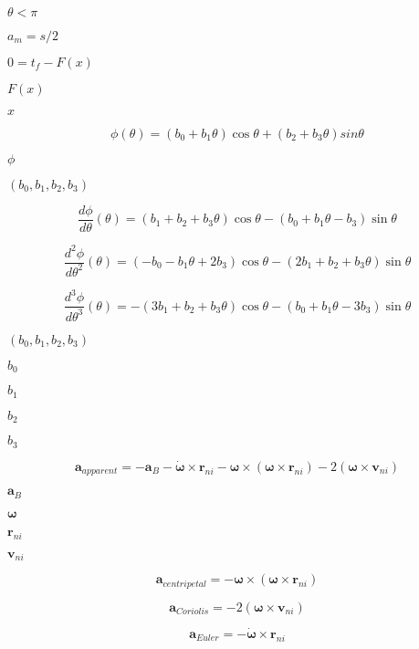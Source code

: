 \documentclass{article}
\begin{document}
$ \theta < \pi $
\pagebreak

$ a_m = s / 2 $
\pagebreak

$ 0 = t_f - F( x ) $
\pagebreak

$ F( x ) $
\pagebreak

$ x $
\pagebreak

\[ \phi ( \theta ) = \left( b_0 + b_1 \theta \right) \cos \theta + \left( b_2 + b_3 \theta \right) sin \theta \]
\pagebreak

$ \phi $
\pagebreak

$ ( b_0 ,b_1, b_2, b_3) $
\pagebreak

\[ \frac{ d \phi }{ d \theta } ( \theta ) = \left( b_1 + b_2 + b_3 \theta \right) \cos \theta - \left( b_0 + b_1 \theta - b_3 \right) \sin \theta \]
\pagebreak

\[ \frac{ d^2 \phi }{ d \theta^2 } ( \theta ) = \left( - b_0 - b_1 \theta + 2 b_3 \right) \cos \theta - \left( 2 b_1 + b_2 + b_3 \theta \right) \sin \theta \]
\pagebreak

\[ \frac{ d^3 \phi }{ d \theta^3 } ( \theta ) = - \left( 3 b_1 + b_2 + b_3 \theta \right) \cos \theta - \left( b_0 + b_1 \theta - 3 b_3 \right) \sin \theta \]
\pagebreak

$ ( b_0 ,b_1, b_2, b_3 ) $
\pagebreak

$ b_0 $
\pagebreak

$ b_1 $
\pagebreak

$ b_2 $
\pagebreak

$ b_3 $
\pagebreak

\[ \boldsymbol{a}_{apparent} = -\boldsymbol{a}_B - \dot{\boldsymbol{\omega}} \times \boldsymbol{r}_{ni} - \boldsymbol{\omega} \times (\boldsymbol{\omega} \times \boldsymbol{r}_{ni}) - 2(\boldsymbol{\omega} \times \boldsymbol{v}_{ni}) \]
\pagebreak

$\boldsymbol{a}_B$
\pagebreak

$\boldsymbol{\omega}$
\pagebreak

$\boldsymbol{r}_{ni}$
\pagebreak

$\boldsymbol{v}_{ni}$
\pagebreak

\[ \boldsymbol{a}_{centripetal} = -\boldsymbol{\omega} \times (\boldsymbol{\omega} \times \boldsymbol{r}_{ni}) \]
\pagebreak

\[ \boldsymbol{a}_{Coriolis} = -2(\boldsymbol{\omega} \times \boldsymbol{v}_{ni}) \]
\pagebreak

\[ \boldsymbol{a}_{Euler} = - \dot{\boldsymbol{\omega}} \times \boldsymbol{r}_{ni} \]
\pagebreak
\end{document}
